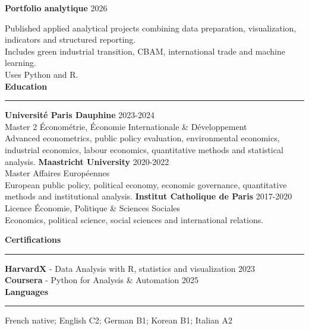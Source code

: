\documentclass[11pt,a4paper]{article}
\newcommand{\sectiontitle}[1]{\vspace{0.26cm}\textbf{\large #1}\vspace{0.10cm}\hrule\vspace{0.13cm}}
\begin{document}
\vspace{0.22cm}
\textbf{Portfolio analytique} \hfill 2026

Published applied analytical projects combining data preparation, visualization, indicators and structured reporting.\\
Includes green industrial transition, CBAM, international trade and machine learning.\\
Uses Python and R.\\



\sectiontitle{Education}

\textbf{Université Paris Dauphine} \hfill 2023-2024\\
Master 2 Économétrie, Économie Internationale \& Développement\\
Advanced econometrics, public policy evaluation, environmental economics, industrial economics, labour economics, quantitative methods and statistical analysis.
\vspace{0.17cm}
\textbf{Maastricht University} \hfill 2020-2022\\
Master Affaires Européennes\\
European public policy, political economy, economic governance, quantitative methods and institutional analysis.
\vspace{0.17cm}
\textbf{Institut Catholique de Paris} \hfill 2017-2020\\
Licence Économie, Politique \& Sciences Sociales\\
Economics, political science, social sciences and international relations.

\sectiontitle{Certifications}

\textbf{HarvardX} - Data Analysis with R, statistics and visualization \hfill 2023\\
\textbf{Coursera} - Python for Analysis \& Automation \hfill 2025\\

\sectiontitle{Languages}

French native; English C2; German B1; Korean B1; Italian A2
\end{document}

